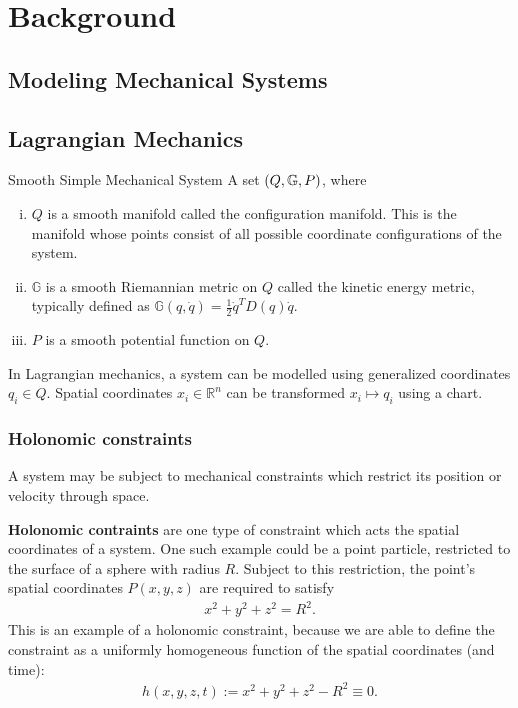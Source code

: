 \documentclass[main.tex]{subfiles}
\begin{document}
\chapter{Background}
\section{Modeling Mechanical Systems}
\section{Lagrangian Mechanics}
\begin{boxdef}{Smooth Simple Mechanical System \cite{mccarthy}}
A set $\del{Q,\mathbb{G},P}$, where
\begin{enumerate}[i.]
    \item $Q$ is a smooth manifold called the configuration manifold. This is the manifold whose points consist of all possible coordinate configurations of the system.
    \item $\mathbb{G}$ is a smooth Riemannian metric on $Q$ called the kinetic energy metric, typically defined as $\mathbb{G}(q,\dot q)=\frac{1}{2}\dot q^T D(q) \dot q$.
    \item $P$ is a smooth potential function on $Q$.
\end{enumerate}
\end{boxdef}
In Lagrangian mechanics, a system can be modelled using generalized coordinates $q_i\in Q$. Spatial coordinates $x_i\in\mathbb{R}^n$ can be transformed $x_i\mapsto q_i$ using a chart. 



\subsection{Holonomic constraints}
A system may be subject to mechanical constraints which restrict its position or velocity through space. 

\textbf{Holonomic contraints} are one type of constraint which acts the spatial coordinates of a system. One such example could be a point particle, restricted to the surface of a sphere with radius $R$. Subject to this restriction, the point's spatial coordinates $P(x,y,z)$ are required to satisfy
\begin{align}
    x^2+y^2+z^2=R^2.
\end{align}
This is an example of a holonomic constraint, because we are able to define the constraint as a uniformly homogeneous function of the spatial coordinates (and time):
\begin{align}
    h(x,y,z,t):=x^2+y^2+z^2-R^2\equiv 0.
\end{align}
\end{document}
